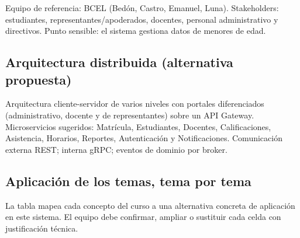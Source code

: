 \documentclass[11pt]{article}
\begin{document}
Equipo de referencia: BCEL (Bedón, Castro, Emanuel, Luna). Stakeholders: estudiantes, representantes/apoderados, docentes, personal administrativo y directivos. Punto sensible: el sistema gestiona datos de menores de edad.

\subsection{Arquitectura distribuida (alternativa propuesta)}
Arquitectura cliente-servidor de varios niveles con portales diferenciados (administrativo, docente y de representantes) sobre un API Gateway. Microservicios sugeridos: Matrícula, Estudiantes, Docentes, Calificaciones, Asistencia, Horarios, Reportes, Autenticación y Notificaciones. Comunicación externa REST; interna gRPC; eventos de dominio por broker.

\subsection{Aplicación de los temas, tema por tema}
La tabla mapea cada concepto del curso a una alternativa concreta de aplicación en este sistema. El equipo debe confirmar, ampliar o sustituir cada celda con justificación técnica.
\end{document}
